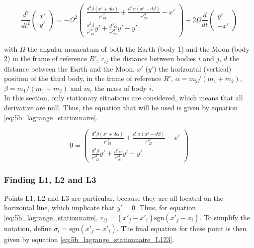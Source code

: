 \documentclass[a4paper,12pt,twoside]{article}
\begin{document}
\begin{equation}
  \frac{d^2}{dt^2}
  \begin{pmatrix}
    x' \\
    y'
  \end{pmatrix}
  = -\Omega^2
  \begin{pmatrix}
    \frac{d^3\beta(x' + d\alpha)}{r'^3_{13}} + \frac{d^3\alpha(x' - d\beta)}{r'^3_{23}} - x'\\
    \frac{d^3\beta}{r'^3_{13}}y' + \frac{d^3\alpha}{r'^3_{23}}y' - y'
  \end{pmatrix}
  + 2\Omega\frac{d}{dt}
  \begin{pmatrix}
    y' \\
    -x'
  \end{pmatrix}
  \label{eq:5b_lagrange_general}
\end{equation}

with $\Omega$ the angular momentum of both the Earth (body 1) and the Moon (body 2) in the frame of reference $R'$, $r_{ij}$ the distance between bodies $i$ and $j$, $d$ the distance between the Earth and the Moon, $x'$ ($y'$) the horizontal (vertical) position of the third body, in the frame of reference $R'$, $\alpha = m_2/(m_1 + m_2)$, $\beta = m_1/(m_1 + m_2)$ and $m_i$ the mass of body $i$.\\

In this section, only stationary situations are considered, which means that all derivative are null.
Thus, the equation that will be used is given by equation \eqref{eq:5b_lagrange_stationnaire}.

\begin{equation}
  0
  =
  \begin{pmatrix}
    \frac{d^3\beta(x' + d\alpha)}{r'^3_{13}} + \frac{d^3\alpha(x' - d\beta)}{r'^3_{23}} - x'\\
    \frac{d^3\beta}{r'^3_{13}}y' + \frac{d^3\alpha}{r'^3_{23}}y' - y'
  \end{pmatrix}
  \label{eq:5b_lagrange_stationnaire}
\end{equation}

\subsubsection{Finding L1, L2 and L3}
Points L1, L2 and L3 are particular, because they are all located on the horizontal line, which implicate that $y'=0$.
Thus, for equation \eqref{eq:5b_lagrange_stationnaire}, $r_{ij} = (x'_j - x'_i)\text{sgn}\left(x'_j - x_i\right)$.
To simplify the notation, define $\sigma_i = \text{sgn}\left(x'_j - x'_i\right)$.
The final equation for these point is then given by equation \eqref{eq:5b_lagrange_stationnaire_L123}.
\end{document}
